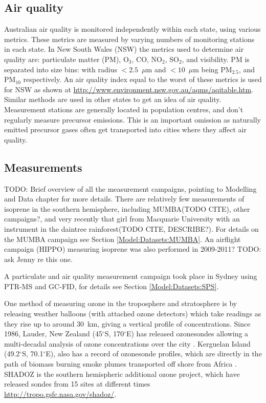   \subsection{Air quality}
    Australian air quality is monitored independently within each state, using various metrics. These metrics are measured by varying numbers of monitoring stations in each state.
    In New South Wales (NSW) the metrics used to determine air quality are: particulate matter (PM), O$_3$, CO, NO$_2$, SO$_2$, and visibility.
    PM is separated into size bins: with radius $< 2.5 $~$\mu$m and $<10$~$\mu$m being PM$_{2.5}$, and PM$_{10}$ respectively.
    An air quality index equal to the worst of these metrics is used for NSW as shown at \url{http://www.environment.nsw.gov.au/aqms/aqitable.htm}.
    Similar methods are used in other states to get an idea of air quality.
    Measurement stations are generally located in population centres, and don't regularly measure precursor emissions. 
    This is an important omission as naturally emitted precursor gases often get transported into cities where they affect air quality.
  
    
  
  
  \subsection{Measurements}
    
    TODO: Brief overview of all the measurement campaigns, pointing to Modelling and Data chapter for more details.
    There are relatively few measurements of isoprene in the southern hemisphere, including MUMBA(TODO CITE), other campaigns?, and very recently that girl from Macquarie University with an instrument in the daintree rainforest(TODO CITE, DESCRIBE?).
    For details on the MUMBA campaign see Section \ref{Model:Datasets:MUMBA}.
    An airflight campaign (HIPPO) measuring isoprene was also performed in 2009-2011? TODO: ask Jenny re this one.
    
    A particulate and air quality measurement campaign took place in Sydney using PTR-MS and GC-FID, for details see Section \ref{Model:Datasets:SPS}.
    
    One method of measuring ozone in the troposphere and stratosphere is by releasing weather balloons (with attached ozone detectors) which take readings as they rise up to around 30~km, giving a vertical profile of concentrations.
    Since 1986, Lauder, New Zealand (45$^{\circ}$S, 170$^{\circ}$E) has released ozonesondes allowing a multi-decadal analysis of ozone concentrations over the city \citep{Brinksma2002}.
    Kerguelan Island (49.2$^{\circ}$S, 70.1$^{\circ}$E), also has a record of ozonesonde profiles, which are directly in the path of biomass burning smoke plumes transported off shore from Africa \citep{Baray2012}.
    SHADOZ is the southern hemispheric additional ozone project, which have released sondes from 15 sites at different times \url{http://tropo.gsfc.nasa.gov/shadoz/}.
  

